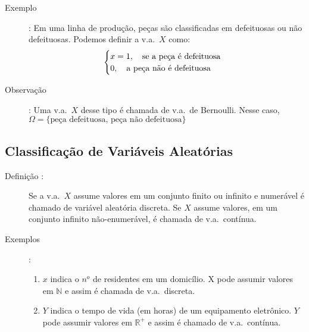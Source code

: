 \begin{description}
     \item [Exemplo]: Em uma linha de produção, peças são classificadas em defeituosas ou não
       defeituosas. Podemos definir a v.a.\ $X$ como:
       \begin{align*}
         \begin{cases}
           x=1,\text{\quad  se a peça é defeituosa}\\ 
           0,\text{\quad  a peça não é defeituosa}
         \end{cases}
       \end{align*}
     \item [Observação]: Uma v.a.\ $X$ desse tipo é chamada de v.a.\ de Bernoulli. Nesse caso, $\Omega=\{ \text{peça defeituosa, peça não defeituosa} \}$
   \end{description}
   \subsection{Classificação de Variáveis Aleatórias}
   \begin{description}
     \item [Definição :] Se a v.a.\ $X$ assume valores em um conjunto finito ou infinito e numerável é chamado 
       de variável aleatória discreta. Se $X$ assume valores, em um conjunto infinito não-enumerável,
       é chamada de v.a.\ contínua.

     \item [Exemplos]:

       \begin{enumerate}[label=(\alph*)]
         \item $x$ indica o $n^o$ de residentes em um domicílio. X pode assumir valores em $\mathbb{N}$ e assim é chamada de 
           v.a.\ discreta.

         \item $Y$ indica o tempo de vida (em horas) de um equipamento eletrônico. $Y$ pode 
           assumir valores em $\mathbb{R}^+$ e assim é chamado de v.a.\ contínua.
       \end{enumerate}
   \end{description}
